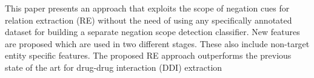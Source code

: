 This paper presents an approach that exploits the scope of negation cues for relation extraction (RE) without the need of using any specifically annotated
 dataset for building a separate negation scope detection classifier. New
 features are proposed which are used in two different stages. These also
 include non-target entity specific features. The proposed RE approach
 outperforms the previous state of the art for drug-drug interaction (DDI)
 extraction

